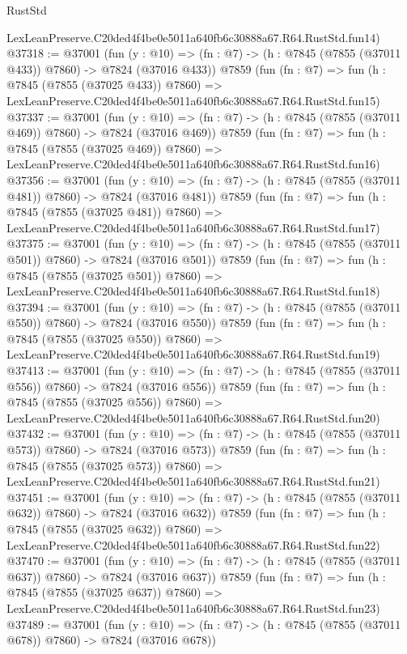 \begin{lexlean}{RustStd}
\begin{coremodule}
    LexLeanPreserve.C20ded4f4be0e5011a640fb6c30888a67.R64.RustStd.fun14)
@37318 := @37001
    (fun (y : @10) => (fn : @7) -> (h : @7845 (@7855 (@37011 @433)) @7860) -> @7824 (@37016 @433))
    @7859
    (fun (fn : @7) =>
    fun (h : @7845 (@7855 (@37025 @433)) @7860) =>
    LexLeanPreserve.C20ded4f4be0e5011a640fb6c30888a67.R64.RustStd.fun15)
@37337 := @37001
    (fun (y : @10) => (fn : @7) -> (h : @7845 (@7855 (@37011 @469)) @7860) -> @7824 (@37016 @469))
    @7859
    (fun (fn : @7) =>
    fun (h : @7845 (@7855 (@37025 @469)) @7860) =>
    LexLeanPreserve.C20ded4f4be0e5011a640fb6c30888a67.R64.RustStd.fun16)
@37356 := @37001
    (fun (y : @10) => (fn : @7) -> (h : @7845 (@7855 (@37011 @481)) @7860) -> @7824 (@37016 @481))
    @7859
    (fun (fn : @7) =>
    fun (h : @7845 (@7855 (@37025 @481)) @7860) =>
    LexLeanPreserve.C20ded4f4be0e5011a640fb6c30888a67.R64.RustStd.fun17)
@37375 := @37001
    (fun (y : @10) => (fn : @7) -> (h : @7845 (@7855 (@37011 @501)) @7860) -> @7824 (@37016 @501))
    @7859
    (fun (fn : @7) =>
    fun (h : @7845 (@7855 (@37025 @501)) @7860) =>
    LexLeanPreserve.C20ded4f4be0e5011a640fb6c30888a67.R64.RustStd.fun18)
@37394 := @37001
    (fun (y : @10) => (fn : @7) -> (h : @7845 (@7855 (@37011 @550)) @7860) -> @7824 (@37016 @550))
    @7859
    (fun (fn : @7) =>
    fun (h : @7845 (@7855 (@37025 @550)) @7860) =>
    LexLeanPreserve.C20ded4f4be0e5011a640fb6c30888a67.R64.RustStd.fun19)
@37413 := @37001
    (fun (y : @10) => (fn : @7) -> (h : @7845 (@7855 (@37011 @556)) @7860) -> @7824 (@37016 @556))
    @7859
    (fun (fn : @7) =>
    fun (h : @7845 (@7855 (@37025 @556)) @7860) =>
    LexLeanPreserve.C20ded4f4be0e5011a640fb6c30888a67.R64.RustStd.fun20)
@37432 := @37001
    (fun (y : @10) => (fn : @7) -> (h : @7845 (@7855 (@37011 @573)) @7860) -> @7824 (@37016 @573))
    @7859
    (fun (fn : @7) =>
    fun (h : @7845 (@7855 (@37025 @573)) @7860) =>
    LexLeanPreserve.C20ded4f4be0e5011a640fb6c30888a67.R64.RustStd.fun21)
@37451 := @37001
    (fun (y : @10) => (fn : @7) -> (h : @7845 (@7855 (@37011 @632)) @7860) -> @7824 (@37016 @632))
    @7859
    (fun (fn : @7) =>
    fun (h : @7845 (@7855 (@37025 @632)) @7860) =>
    LexLeanPreserve.C20ded4f4be0e5011a640fb6c30888a67.R64.RustStd.fun22)
@37470 := @37001
    (fun (y : @10) => (fn : @7) -> (h : @7845 (@7855 (@37011 @637)) @7860) -> @7824 (@37016 @637))
    @7859
    (fun (fn : @7) =>
    fun (h : @7845 (@7855 (@37025 @637)) @7860) =>
    LexLeanPreserve.C20ded4f4be0e5011a640fb6c30888a67.R64.RustStd.fun23)
@37489 := @37001
    (fun (y : @10) => (fn : @7) -> (h : @7845 (@7855 (@37011 @678)) @7860) -> @7824 (@37016 @678))

\end{coremodule}
\end{lexlean}
